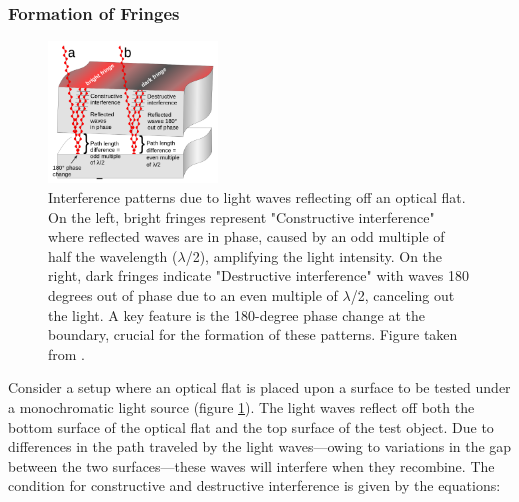 \documentclass[../main.tex]{subfiles}
\begin{document}
\subsubsection{Formation of Fringes}
\vspace{-15pt}
\begin{minipage}{\textwidth}
\begin{figure}%
    \vspace{\dimexpr0.3\baselineskip-\topskip}%
    \vspace{-2cm}
    \noindent
    \includegraphics[width=0.4\textwidth]{Images/Introduction/Optical_flat_interference}
    \vspace{-8pt}
    \caption{Interference patterns due to light waves reflecting off an optical flat. On the left, bright fringes represent "Constructive interference" where reflected waves are in phase, caused by an odd multiple of half the wavelength (\(\lambda\)/2), amplifying the light intensity. On the right, dark fringes indicate "Destructive interference" with waves 180 degrees out of phase due to an even multiple of \(\lambda\)/2, canceling out the light. A key feature is the 180-degree phase change at the boundary, crucial for the formation of these patterns. Figure taken from \cite{enwiki:1212101911}.}
    \label{fig:interference_fringes}
\end{figure}
Consider a setup where an optical flat is placed upon a surface to be tested under a monochromatic light source (figure \ref{fig:interference_fringes}). The light waves reflect off both the bottom surface of the optical flat and the top surface of the test object. Due to differences in the path traveled by the light waves—owing to variations in the gap between the two surfaces—these waves will interfere when they recombine. The condition for constructive and destructive interference is given by the equations:
\end{minipage}
\end{document}
